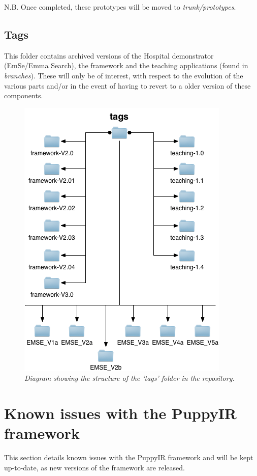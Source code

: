 \documentclass[letterpaper,10pt,english]{sphinxmanual}
\begin{document}
N.B. Once completed, these prototypes will be moved to \emph{trunk/prototypes}.


\subsection{Tags}
\label{repo:tags}
This folder contains archived versions of the Hospital demonstrator (EmSe/Emma Search), the framework and the teaching applications (found in \emph{branches}). These will only be of interest, with respect to the evolution of the various parts and/or in the event of having to revert to a older version of these components.
\begin{figure}[htbp]
\centering
\capstart

\includegraphics{tag.png}
\caption{\emph{Diagram showing the structure of the `tags' folder in the repository.}}\end{figure}


\section{Known issues with the PuppyIR framework}
\label{issues:known-issues-with-the-puppyir-framework}\label{issues::doc}\label{issues:issues}
This section details known issues with the PuppyIR framework and will be kept up-to-date, as new versions of the framework are released.
\end{document}
